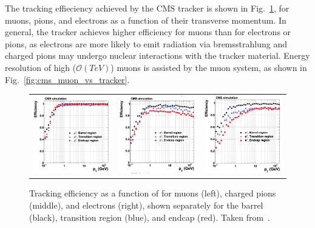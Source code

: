 The tracking effieciency achieved by the CMS tracker is shown in Fig.~\ref{fig:cms_tracker_eff}, for muons, pions, and electrons as a function of their transverse momentum.
In general, the tracker achieves higher efficiency for muons than for electrons or pions, as electrons are more likely to emit radiation via bremsstrahlung and charged pions may undergo nuclear interactions with the tracker material.
Energy resolution of high \pT ($\mathcal O(TeV)$) muons is assisted by the muon system, as shown in Fig.~\ref{fig:cms_muon_vs_tracker}.

\begin{figure} [htbp!]
    \centering
    \begin{tabular}{c c c}
        \includegraphics[width=0.31\linewidth]{figures/cms/cms_tracker_muon.png} &
        \includegraphics[width=0.31\linewidth]{figures/cms/cms_tracker_pion.png} &
        \includegraphics[width=0.31\linewidth]{figures/cms/cms_tracker_electron.png}
    \end{tabular}
    \caption{Tracking efficiency as a function of \pT for muons (left), charged pions (middle), and electrons (right), shown separately for the barrel (black), transition region (blue), and endcap (red). Taken from~\cite{Chatrchyan:1704291}.}
    \label{fig:cms_tracker_eff}
\end{figure}


